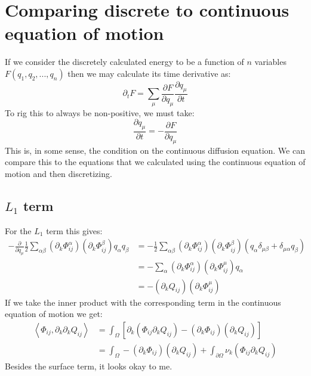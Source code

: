 \documentclass[reqno]{article}
\begin{document}
\section{Comparing discrete to continuous equation of motion}

If we consider the discretely calculated energy to be a function of $n$ variables $F(q_1, q_2, ..., q_n)$ then we may calculate its time derivative as:
\begin{equation}
    \partial_t F
    =
    \sum_\mu \frac{\partial F}{\partial q_\mu} \frac{\partial q_\mu}{\partial t}
\end{equation}
To rig this to always be non-positive, we must take:
\begin{equation}
    \frac{\partial q_\mu}{\partial t}
    =
    -\frac{\partial F}{\partial q_\mu}
\end{equation}
This is, in some sense, the condition on the continuous diffusion equation.
We can compare this to the equations that we calculated using the continuous equation of motion and then discretizing.

\subsection{$L_1$ term}

For the $L_1$ term this gives:
\begin{equation}
\begin{split}
    -\frac{\partial}{\partial q_\mu} 
    \frac12 \sum_{\alpha \beta} \left(\partial_k \Phi^\alpha_{ij} \right) \left(\partial_k \Phi^\beta_{ij} \right) q_\alpha q_\beta
    &=
    - \frac12 \sum_{\alpha \beta} \left(\partial_k \Phi^\alpha_{ij} \right) \left(\partial_k \Phi^\beta_{ij} \right) 
    \left(
        q_\alpha \delta_{\mu \beta}
        + \delta_{\mu \alpha} q_\beta
    \right) \\
    &=
    - \sum_\alpha \left(\partial_k \Phi^\alpha_{ij} \right) \left(\partial_k \Phi^\mu_{ij} \right) q_\alpha \\
    &=
    -\left( \partial_k Q_{ij} \right) \left( \partial_k \Phi^\mu_{ij} \right)
\end{split}
\end{equation}
If we take the inner product with the corresponding term in the continuous equation of motion we get:
\begin{equation}
\begin{split}
    \left< \Phi_{ij}, \partial_k \partial_k Q_{ij} \right>
    &=
    \int_\Omega \left[
        \partial_k \left( \Phi_{ij} \partial_k Q_{ij} \right)
        - \left( \partial_k \Phi_{ij} \right) \left( \partial_k Q_{ij} \right)
    \right] \\
    &=
    \int_\Omega 
        - \left( \partial_k \Phi_{ij} \right) \left( \partial_k Q_{ij} \right)
    +
    \int_{\partial \Omega}
        \nu_k \left( \Phi_{ij} \partial_k Q_{ij} \right)
\end{split} 
\end{equation}
Besides the surface term, it looks okay to me.
\end{document}
